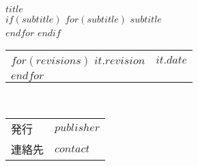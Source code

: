 \begin{titlepage}
    \begin{center}
        \textsf{$title$} \\
        $if(subtitle)$
        $for(subtitle)$
            $subtitle$ \\
        $endfor$
        $endif$
        \begin{tabular}{ll}
            $for(revisions)$
                $it.revision$ & $it.date$ \\
            $endfor$
        \end{tabular} \\
        \begin{tabular}{ll} \toprule
            発行   & $publisher$ \\
            連絡先 & $contact$ \\ \bottomrule
        \end{tabular}
    \end{center}
\end{titlepage}
